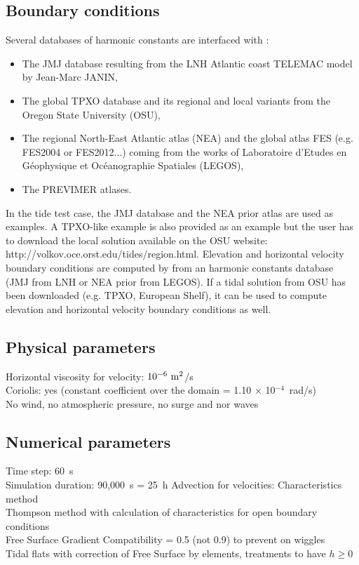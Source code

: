\subsection{Boundary conditions}
%
Several databases of harmonic constants are interfaced with
:
\begin{itemize}
\item The JMJ database resulting from the LNH Atlantic coast TELEMAC
model by Jean-Marc JANIN,
\item The global TPXO database and its regional and local variants
from the Oregon State University (OSU),
\item The regional North-East Atlantic atlas (NEA) and the global
atlas FES (e.g. FES2004 or FES2012...) coming from the works of
Laboratoire d’Etudes en Géophysique et Océanographie Spatiales (LEGOS),
\item The PREVIMER atlases.
\end{itemize}

In the tide test case, the JMJ database and the NEA prior atlas are
used as examples.
A TPXO-like example is also provided as an example but the user has
to download the local solution available on the OSU website:
http://volkov.oce.orst.edu/tides/region.html.
Elevation and horizontal velocity boundary conditions are computed by
 from an harmonic constants database (JMJ from LNH or
NEA prior from LEGOS). If a tidal solution from OSU has been downloaded (e.g. TPXO, European
Shelf), it can be used to compute elevation and horizontal velocity
boundary conditions as well.

\subsection{Physical parameters}
%
Horizontal viscosity for velocity: $10^{-6}~\rm{m}^2$/s\\
Coriolis: yes (constant coefficient over the domain
= 1.10 $\times$ 10$^{-4}$~rad/s)\\
No wind, no atmospheric pressure, no surge and nor waves

\subsection{Numerical parameters}

Time step: 60~s\\
Simulation duration: 90,000~s = 25~h
%
Advection for velocities: Characteristics method\\
Thompson method with calculation of characteristics for open boundary
conditions\\
Free Surface Gradient Compatibility = 0.5 (not 0.9) to prevent on
wiggles\\
Tidal flats with correction of Free Surface by elements, treatments
to have $h \ge 0$
%
